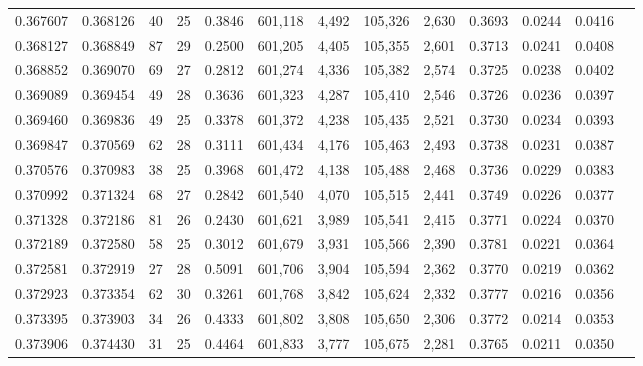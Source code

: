 \begin{tabular}{rrrrrrrrrrrrr}
0.367607 & 0.368126 &  40 &  25 &                                     0.3846 & 601,118 &   4,492 & 105,326 &   2,630 & 0.3693 & 0.0244 & 0.0416 \\
0.368127 & 0.368849 &  87 &  29 &                                     0.2500 & 601,205 &   4,405 & 105,355 &   2,601 & 0.3713 & 0.0241 & 0.0408 \\
0.368852 & 0.369070 &  69 &  27 &                                     0.2812 & 601,274 &   4,336 & 105,382 &   2,574 & 0.3725 & 0.0238 & 0.0402 \\
0.369089 & 0.369454 &  49 &  28 &                                     0.3636 & 601,323 &   4,287 & 105,410 &   2,546 & 0.3726 & 0.0236 & 0.0397 \\
0.369460 & 0.369836 &  49 &  25 &                                     0.3378 & 601,372 &   4,238 & 105,435 &   2,521 & 0.3730 & 0.0234 & 0.0393 \\
0.369847 & 0.370569 &  62 &  28 &                                     0.3111 & 601,434 &   4,176 & 105,463 &   2,493 & 0.3738 & 0.0231 & 0.0387 \\
0.370576 & 0.370983 &  38 &  25 &                                     0.3968 & 601,472 &   4,138 & 105,488 &   2,468 & 0.3736 & 0.0229 & 0.0383 \\
0.370992 & 0.371324 &  68 &  27 &                                     0.2842 & 601,540 &   4,070 & 105,515 &   2,441 & 0.3749 & 0.0226 & 0.0377 \\
0.371328 & 0.372186 &  81 &  26 &                                     0.2430 & 601,621 &   3,989 & 105,541 &   2,415 & 0.3771 & 0.0224 & 0.0370 \\
0.372189 & 0.372580 &  58 &  25 &                                     0.3012 & 601,679 &   3,931 & 105,566 &   2,390 & 0.3781 & 0.0221 & 0.0364 \\
0.372581 & 0.372919 &  27 &  28 &                                     0.5091 & 601,706 &   3,904 & 105,594 &   2,362 & 0.3770 & 0.0219 & 0.0362 \\
0.372923 & 0.373354 &  62 &  30 &                                     0.3261 & 601,768 &   3,842 & 105,624 &   2,332 & 0.3777 & 0.0216 & 0.0356 \\
0.373395 & 0.373903 &  34 &  26 &                                     0.4333 & 601,802 &   3,808 & 105,650 &   2,306 & 0.3772 & 0.0214 & 0.0353 \\
0.373906 & 0.374430 &  31 &  25 &                                     0.4464 & 601,833 &   3,777 & 105,675 &   2,281 & 0.3765 & 0.0211 & 0.0350 \\

\end{tabular}
